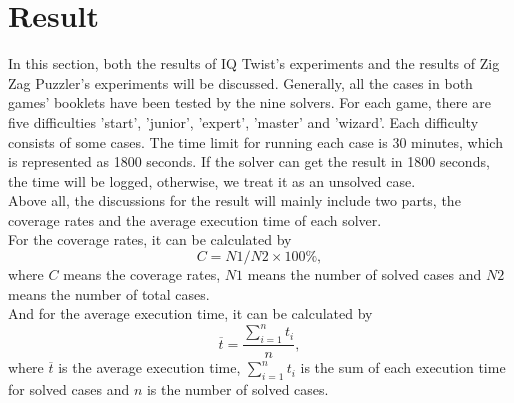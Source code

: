 \section{Result}
\label{sec:Result}
In this section, both the results of IQ Twist's experiments and the results of Zig Zag Puzzler's experiments will be discussed. Generally, all the cases in both games' booklets have been tested by the nine solvers. For each game, there are five difficulties 'start', 'junior', 'expert', 'master' and 'wizard'. Each difficulty consists of some cases. The time limit for running each case is 30 minutes, which is represented as 1800 seconds. If the solver can get the result in 1800 seconds, the time will be logged, otherwise, we treat it as an unsolved case. 
\\Above all, the discussions for the result will mainly include two parts, the coverage rates and the average execution time of each solver. 
\\For the coverage rates, it can be calculated by 
\begin{equation}
\label{equation:coverage}
   C= N1/N2\times 100\% ,
\end{equation}
where $C$ means the coverage rates, $N1$ means the number of solved cases and $N2$ means the number of total cases. 
\\And for the average execution time, it can be calculated by 
\begin{equation}
\label{equation:averagetime}
\overline{t}=\frac{\sum\limits_{i=1}^n t_{i}}{n},
\end{equation}
where $\overline{t}$ is the average execution time, $\sum\limits_{i=1}^n t_{i}$ is the sum of each execution time for solved cases and $n$ is the number of solved cases.
